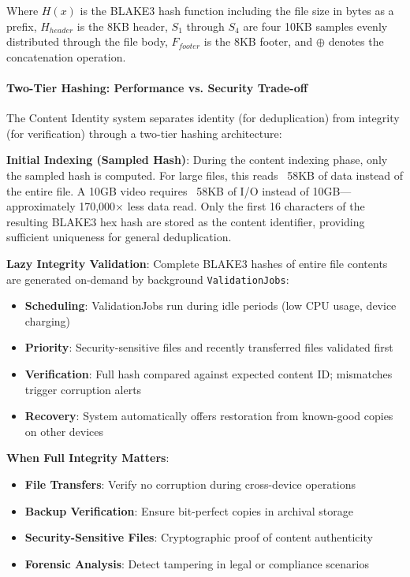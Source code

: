 \documentclass[sigconf]{acmart}
\begin{document}
Where $H(x)$ is the BLAKE3 hash function including the file size in bytes as a prefix, $H_{header}$ is the 8KB header, $S_1$ through $S_4$ are four 10KB samples evenly distributed through the file body, $F_{footer}$ is the 8KB footer, and $\oplus$ denotes the concatenation operation.

\paragraph{Two-Tier Hashing: Performance vs. Security Trade-off}
The Content Identity system separates identity (for deduplication) from integrity (for verification) through a two-tier hashing architecture:

\textbf{Initial Indexing (Sampled Hash)}: During the content indexing phase, only the sampled hash is computed. For large files, this reads ~58KB of data instead of the entire file. A 10GB video requires ~58KB of I/O instead of 10GB—approximately 170,000× less data read. Only the first 16 characters of the resulting BLAKE3 hex hash are stored as the content identifier, providing sufficient uniqueness for general deduplication.

\textbf{Lazy Integrity Validation}: Complete BLAKE3 hashes of entire file contents are generated on-demand by background \texttt{ValidationJobs}:

\begin{itemize}[noitemsep, topsep=0pt]
 \item \textbf{Scheduling}: ValidationJobs run during idle periods (low CPU usage, device charging)
 \item \textbf{Priority}: Security-sensitive files and recently transferred files validated first
 \item \textbf{Verification}: Full hash compared against expected content ID; mismatches trigger corruption alerts
 \item \textbf{Recovery}: System automatically offers restoration from known-good copies on other devices
\end{itemize}

\textbf{When Full Integrity Matters}:

\begin{itemize}[noitemsep, topsep=0pt]
 \item \textbf{File Transfers}: Verify no corruption during cross-device operations
 \item \textbf{Backup Verification}: Ensure bit-perfect copies in archival storage
 \item \textbf{Security-Sensitive Files}: Cryptographic proof of content authenticity
 \item \textbf{Forensic Analysis}: Detect tampering in legal or compliance scenarios
\end{itemize}
\end{document}
